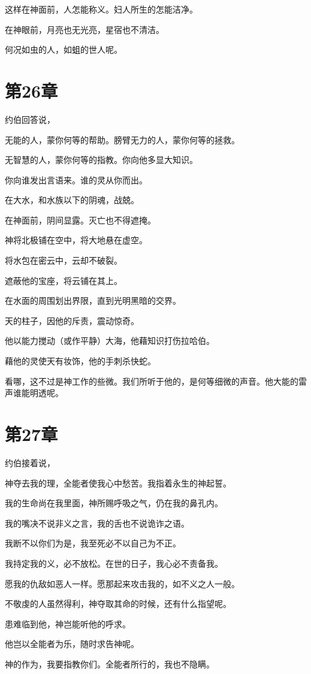 \documentclass[12pt,oneside]{book}
\begin{document}
这样在神面前，人怎能称义。妇人所生的怎能洁净。

在神眼前，月亮也无光亮，星宿也不清洁。

何况如虫的人，如蛆的世人呢。


\chapter{第26章}
约伯回答说，

无能的人，蒙你何等的帮助。膀臂无力的人，蒙你何等的拯救。

无智慧的人，蒙你何等的指教。你向他多显大知识。

你向谁发出言语来。谁的灵从你而出。

在大水，和水族以下的阴魂，战兢。

在神面前，阴间显露。灭亡也不得遮掩。

神将北极铺在空中，将大地悬在虚空。

将水包在密云中，云却不破裂。

遮蔽他的宝座，将云铺在其上。

在水面的周围划出界限，直到光明黑暗的交界。

天的柱子，因他的斥责，震动惊奇。

他以能力搅动（或作平静）大海，他藉知识打伤拉哈伯。

藉他的灵使天有妆饰，他的手刺杀快蛇。

看哪，这不过是神工作的些微。我们所听于他的，是何等细微的声音。他大能的雷声谁能明透呢。


\chapter{第27章}
约伯接着说，

神夺去我的理，全能者使我心中愁苦。我指着永生的神起誓。

我的生命尚在我里面，神所赐呼吸之气，仍在我的鼻孔内。

我的嘴决不说非义之言，我的舌也不说诡诈之语。

我断不以你们为是，我至死必不以自己为不正。

我持定我的义，必不放松。在世的日子，我心必不责备我。

愿我的仇敌如恶人一样。愿那起来攻击我的，如不义之人一般。

不敬虔的人虽然得利，神夺取其命的时候，还有什么指望呢。

患难临到他，神岂能听他的呼求。

他岂以全能者为乐，随时求告神呢。

神的作为，我要指教你们。全能者所行的，我也不隐瞒。
\end{document}
